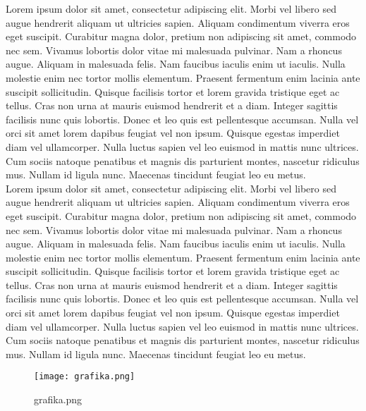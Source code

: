 \documentclass[a4paper]{report}             %
\begin{document}
\begin{em}
Lorem ipsum dolor sit amet, consectetur adipiscing elit. Morbi vel libero sed
augue hendrerit aliquam ut ultricies sapien. Aliquam condimentum viverra eros
eget suscipit. Curabitur magna dolor, pretium non adipiscing sit amet, commodo
nec sem. Vivamus lobortis dolor vitae mi malesuada pulvinar. Nam a rhoncus
augue. Aliquam in malesuada felis. Nam faucibus iaculis enim ut iaculis. Nulla
molestie enim nec tortor mollis elementum. Praesent fermentum enim lacinia
ante suscipit sollicitudin. Quisque facilisis tortor et lorem gravida
tristique eget ac tellus. Cras non urna at mauris euismod hendrerit et a diam.
Integer sagittis facilisis nunc quis lobortis. Donec et leo quis est
pellentesque accumsan. Nulla vel orci sit amet lorem dapibus feugiat vel non
ipsum. Quisque egestas imperdiet diam vel ullamcorper. Nulla luctus sapien vel
leo euismod in mattis nunc ultrices. Cum sociis natoque penatibus et magnis
dis parturient montes, nascetur ridiculus mus. Nullam id ligula nunc. Maecenas
tincidunt feugiat leo eu metus. \\
Lorem ipsum dolor sit amet, consectetur adipiscing elit. Morbi vel libero sed
augue hendrerit aliquam ut ultricies sapien. Aliquam condimentum viverra eros
eget suscipit. Curabitur magna dolor, pretium non adipiscing sit amet, commodo
nec sem. Vivamus lobortis dolor vitae mi malesuada pulvinar. Nam a rhoncus
augue. Aliquam in malesuada felis. Nam faucibus iaculis enim ut iaculis. Nulla
molestie enim nec tortor mollis elementum. Praesent fermentum enim lacinia
ante suscipit sollicitudin. Quisque facilisis tortor et lorem gravida
tristique eget ac tellus. Cras non urna at mauris euismod hendrerit et a diam.
Integer sagittis facilisis nunc quis lobortis. Donec et leo quis est
pellentesque accumsan. Nulla vel orci sit amet lorem dapibus feugiat vel non
ipsum. Quisque egestas imperdiet diam vel ullamcorper. Nulla luctus sapien vel
leo euismod in mattis nunc ultrices. Cum sociis natoque penatibus et magnis
dis parturient montes, nascetur ridiculus mus. Nullam id ligula nunc. Maecenas
tincidunt feugiat leo eu metus.
\end{em}

\begin{figure}[ht]
    \caption{grafika.png}
    \texttt{[image: grafika.png]}
\end{figure}


\appendix                                   %
\end{document}
